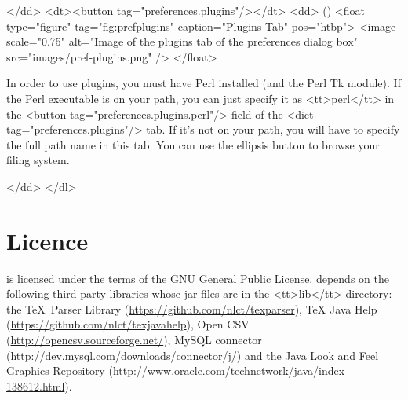     </dd>
    <dt><button tag="preferences.plugins"/></dt>
    <dd>
        ()
     <float type="figure" tag="fig:prefplugins" caption="Plugins Tab" pos="htbp">
      <image scale="0.75" alt="Image of the plugins tab of the preferences dialog box" src="images/pref-plugins.png" />
     </float>

    In order to use  plugins, you must have Perl installed (and the
    Perl Tk module). If the Perl executable is on your path, you can just
    specify it as <tt>perl</tt> in the <button tag="preferences.plugins.perl"/>
    field of the <dict tag="preferences.plugins"/> tab. If it's not on your
    path, you will have to specify the full path name in this tab. You can
    use the ellipsis button to browse your filing system.

    </dd>
   </dl>


\chapter{Licence}
\label{sec:licence}
    is licensed under the terms of the GNU General Public License.
    depends on the following third party libraries whose jar files are
   in the <tt>lib</tt> directory: the \TeX\ Parser Library 
   (\url{https://github.com/nlct/texparser}),
   TeX Java Help 
   (\url{https://github.com/nlct/texjavahelp}),
   Open CSV (\url{http://opencsv.sourceforge.net/}),
   MySQL connector (\url{http://dev.mysql.com/downloads/connector/j/})
   and the Java Look and Feel Graphics Repository
   (\url{http://www.oracle.com/technetwork/java/index-138612.html}).



\printmain
\printindex

